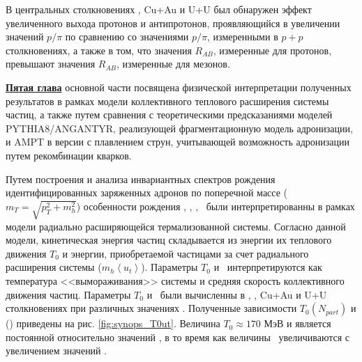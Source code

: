 \begin{comment}
\begin{figure}[] 
	\centerfloat
	\includegraphics [width=0.7\linewidth]{Results/DrawMesons_small.png}
	\caption{Значения факторов ядерной модификации ($R_{AB}$), измеренные для легких адронов(\pipm, \Kpm, \prots, $\pi^{0}$, $\phi$) в центральных и периферических столкновениях \pal \ и \heau.} 
	\label{img:synops_DrawMesonsSmall}
\end{figure}

\begin{figure}[] 
	\centerfloat
	\includegraphics [width=0.7\linewidth]{Results/DrawMesons_large.png}
	\caption{Значения факторов ядерной модификации ($R_{AB}$), измеренные для легких адронов(\pipm, \Kpm, \prots, $\pi^{0}$, $\phi$) в центральных и периферических столкновениях Cu+Au и U+U.} 
	\label{img:synops_DrawMesonsLarge}
\end{figure}
\end{comment}

В центральных столкновениях \heau, Cu+Au и U+U был обнаружен эффект увеличенного выхода протонов и антипротонов, проявляющийся в увеличении значений $p/\pi$ по сравнению со значениями $p/\pi$, измеренными в $p+p$ столкновениях, а также в том, что значения $R_{AB}$, измеренные для протонов, превышают значения $R_{AB}$, измеренные для мезонов. 


\underline{\textbf{Пятая глава}} основной части посвящена физической интерпретации полученных результатов в рамках модели коллективного теплового расширения системы частиц, а также путем сравнения с теоретическими предсказаниями моделей PYTHIA8/ANGANTYR, реализующей фрагментационную модель адронизации, и AMPT в версии с плавлением струн, учитывающей возможность адронизации путем рекомбинации кварков.

Путем построения и анализа инвариантных спектров рождения идентифицированных заряженных адронов по поперечной массе ($m_T = \sqrt{p_T^2 +m_h^2}$) особенности рождения \pipm, \Kpm, \prot, \aprot \ были интерпретированны в рамках модели радиально расширяющейся термализованной системы. Согласно данной модели, кинетическая энергия частиц складывается из энергии их теплового движения $T_0$ и энергии, приобретаемой частицами за счет радиального расширения системы ($m_h\left< u_t\right>$). Параметры $T_0$ и \ut \  интерпретируются как температура <<вымораживания>> системы и средняя скорость коллективного движения частиц. Параметры $T_{0}$ и \ut \ были вычисленны в \pal, \heau, Cu+Au и U+U столкновениях при различных значениях \Npart. 
Полученные зависимости $T_{0}(N_{part})$ и \ut(\Npart) приведены на рис. \ref{fig:synops_T0ut}. Величина $T_{0}\approx170$ МэВ и является постоянной относительно значений \Npart, в то время как величины \ut \ увеличиваются с увеличением значений \Npart.

